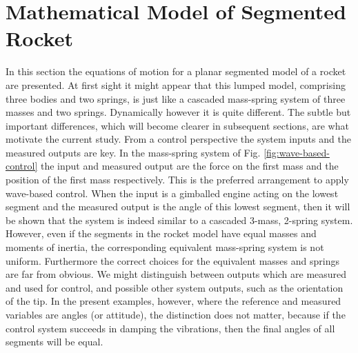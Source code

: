 \documentclass{mbd_fullpaper}
\begin{document}
\section{Mathematical Model of Segmented Rocket}
\label{sec:math-model}
In this section the equations of motion for a planar segmented model of a rocket are presented.
At first sight it might appear that this lumped model, comprising three bodies and two springs, is just like a cascaded mass-spring system of three masses and two springs. Dynamically however it is quite different.
The subtle but important differences, which will become clearer in subsequent sections, are what motivate the current study.
From a control perspective the system inputs and the measured outputs are key.
In the mass-spring system of Fig. \ref{fig:wave-based-control} the input and measured output are the force on the first mass and the position of the first mass respectively.
This is the preferred arrangement to apply wave-based control.
When the input is a gimballed engine acting on the lowest segment and the measured output is the angle of this lowest segment, then it will be shown that the system is indeed similar to a cascaded 3-mass, 2-spring system. However, even if the segments in the rocket model have equal masses and moments of inertia, the corresponding equivalent mass-spring system  is not uniform.
Furthermore the correct choices for the equivalent masses and springs are far from obvious.
We might distinguish between outputs which are measured and used for control, and possible other system outputs, such as the orientation of the tip.
In the present examples, however, where the reference and measured variables are angles (or attitude), the distinction does not matter, because if the control system succeeds in damping the vibrations, then the final angles of all segments will be equal.
\end{document}
